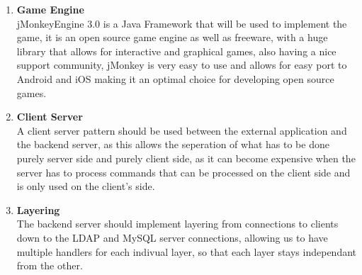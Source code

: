 \documentclass[letterpaper]{article}
\begin{document}
				\begin{enumerate}
					\item \textbf{Game Engine}
					\\jMonkeyEngine 3.0 is a Java Framework that will be used to implement the game, it is an open source game engine as well as freeware, with a huge library that allows for interactive and graphical games, also having a nice support community, jMonkey is very easy to use and allows for easy port to Android and iOS making it an optimal choice for developing open source games.
					
					\item \textbf{Client Server}
					\\A client server pattern should be used between the external application and the backend server, as this allows the seperation of what has to be done purely server side and purely client side, as it can become expensive when the server has to process commands that can be processed on the client side and is only used on the client's side.
					
					\item \textbf{Layering}
					\\The backend server should implement layering from connections to clients down to the LDAP and MySQL server connections, allowing us to have multiple handlers for each indivual layer, so that each layer stays independant from the other.
				\end{enumerate}
			
		\vspace{0.2in}
			
			
			
		\vspace{0.2in}
\end{document}
